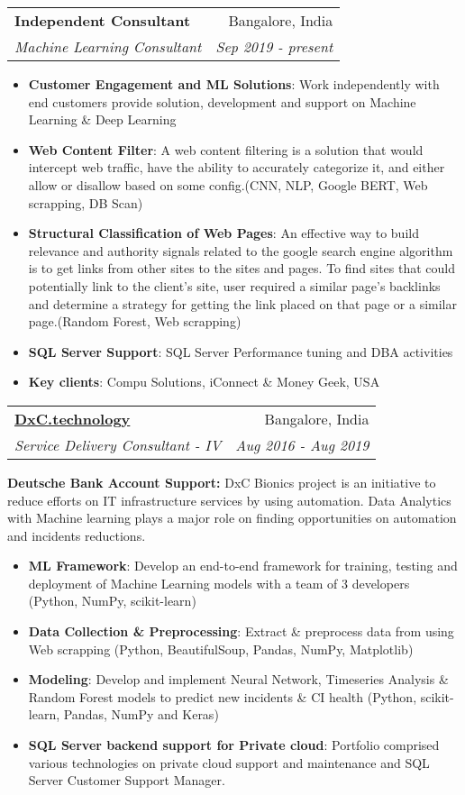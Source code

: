 \documentclass[letterpaper,11pt]{article}
\makeatletter
\newcommand{\resumeItem}[2]{
  \item\small{
    \textbf{#1}{: #2 \vspace{-2pt}}
  }
}
\newcommand{\resumeSubheading}[4]{
  \vspace{-1pt}\item
    \begin{tabular*}{0.97\textwidth}[t]{l@{\extracolsep{\fill}}r}
      \textbf{#1} & #2 \\
      \textit{\small#3} & \textit{\small #4} \\
    \end{tabular*}\vspace{-5pt}
}
\newcommand{\resumeItemListStart}{\begin{itemize}}
\newcommand{\resumeItemListEnd}{\end{itemize}\vspace{-5pt}}
\makeatother
\begin{document}
    \resumeSubheading
      {Independent Consultant}{Bangalore, India}
      {Machine Learning Consultant}{Sep 2019 - present}
\resumeItemListStart
\resumeItem{Customer Engagement and ML Solutions}
          {Work independently with end customers provide solution, development and support on Machine Learning \& Deep Learning}
\resumeItem{Web Content Filter}{A web content filtering is a solution that would intercept web traffic, have the ability to accurately categorize it, and either allow or disallow based on some config.(CNN, NLP, Google BERT, Web scrapping, DB Scan) }
\resumeItem{Structural Classification of Web Pages}{An effective way to build relevance and authority signals related to the google search engine algorithm is to get links from other sites to the sites and pages.  To find sites that could potentially link to the client’s site, user required a similar page’s backlinks and determine a strategy for getting the link placed on that page or a similar page.(Random Forest, Web scrapping)}
\resumeItem{SQL Server Support}{SQL Server Performance tuning and DBA activities}
\resumeItem{Key clients} {Compu Solutions, iConnect \& Money Geek, USA}
      \resumeItemListEnd


    \resumeSubheading
      {\href{https://www.dxc.com/}{DxC.technology}}{Bangalore, India}
      {Service Delivery Consultant - IV}{Aug 2016 - Aug 2019}

\textbf{Deutsche Bank Account Support:}
DxC Bionics project is an initiative to reduce efforts on IT infrastructure services by using automation. Data Analytics with Machine learning plays a major role on finding opportunities on automation and incidents reductions.
      \resumeItemListStart
        \resumeItem{ML Framework}
          {Develop an end-to-end framework for training, testing and deployment of Machine Learning models with a team of 3 developers (Python, NumPy, scikit-learn)}
        \resumeItem{Data Collection \& Preprocessing}
          {Extract \& preprocess data from using Web scrapping (Python, BeautifulSoup, Pandas, NumPy, Matplotlib)}
        \resumeItem{Modeling}
          {Develop and implement Neural Network, Timeseries Analysis \& Random Forest models to predict new incidents \& CI health  (Python, scikit-learn, Pandas, NumPy and Keras)}
        \resumeItem{SQL Server backend support for Private cloud}
	{Portfolio comprised various technologies on private cloud support and maintenance and SQL Server Customer Support Manager.}	
      \resumeItemListEnd
\end{document}
